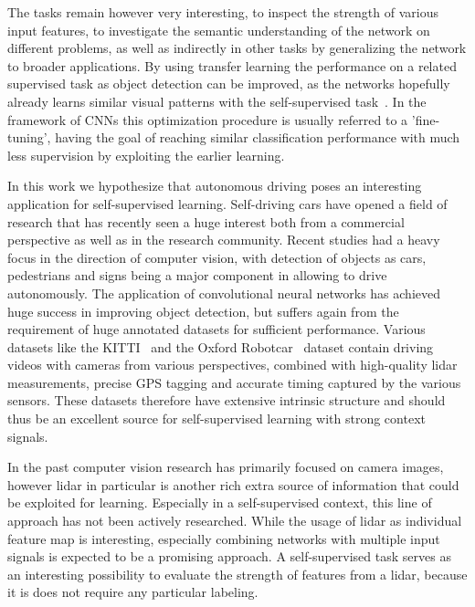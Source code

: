 The tasks remain however very interesting, to inspect the strength of various input features, to investigate the semantic understanding of the network on different problems, as well as indirectly in other tasks by generalizing the network to broader applications. By using transfer learning the performance on a related supervised task as object detection can be improved, as the networks hopefully already learns similar visual patterns with the self-supervised task~\cite{raina2007}. In the framework of CNNs this optimization procedure is usually referred to a 'fine-tuning', having the goal of reaching similar classification performance with much less supervision by exploiting the earlier learning.

In this work we hypothesize that autonomous driving poses an interesting application for self-supervised learning. Self-driving cars have opened a field of research that has recently seen a huge interest both from a commercial perspective as well as in the research community. Recent studies had a heavy focus in the direction of computer vision, with detection of objects as cars, pedestrians and signs being a major component in allowing to drive autonomously. The application of convolutional neural networks has achieved huge success in improving object detection\cite{bojarski2016end}, but suffers again from the requirement of huge annotated datasets for sufficient performance. Various datasets like the KITTI~\cite{geiger2012} and the Oxford Robotcar~\cite{maddern2017} dataset contain driving videos with cameras from various perspectives, combined with high-quality lidar measurements, precise GPS tagging and accurate timing captured by the various sensors. These datasets therefore have extensive intrinsic structure and should thus be an excellent source for self-supervised learning with strong context signals. 

In the past computer vision research has primarily focused on camera images, however lidar in particular is another rich extra source of information that could be exploited for learning. Especially in a self-supervised context, this line of approach has not been actively researched. While the usage of lidar as individual feature map is interesting, especially combining networks with multiple input signals is expected to be a promising approach. A self-supervised task serves as an interesting possibility to evaluate the strength of features from a lidar, because it is does not require any particular labeling.

